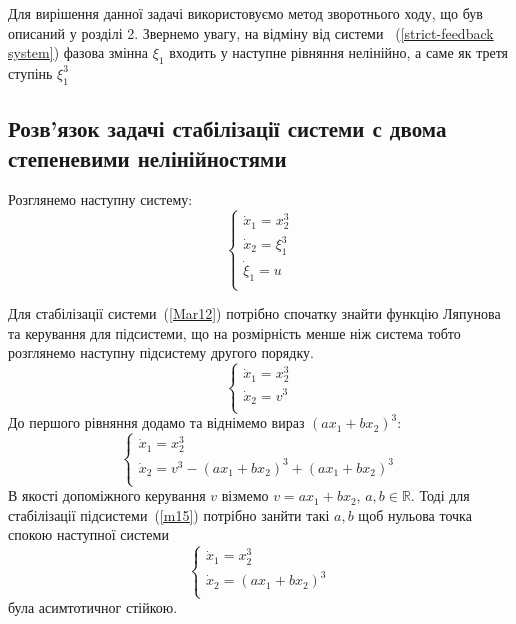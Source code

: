 \documentclass{article}
\begin{document}
Для вирішення данної задачі
використовуємо метод зворотнього ходу, що був описаний у розділі 2. Звернемо увагу, на відміну від 
системи ~(\ref{strict-feedback system}) фазова змінна $\xi_1$ входить у наступне рівняння нелінійно,
а саме як третя ступінь $\xi_1^3$
\pagebreak


\subsection{Розв'язок задачі стабілізації системи с двома степеневими нелінійностями}
Розглянемо наступну систему:
\begin{equation}\label{3dim nonlinear system}
    \begin{cases}
    \dot x_1 = x_2^3 \\
    \dot x_2 = \xi_1^3\\
    \dot \xi_1 = u\\
    \end{cases}
\end{equation}

Для стабілізації системи~(\ref{Mar12}) потрібно спочатку знайти функцію Ляпунова
та керування для підсистеми, що на розмірність менше ніж система  тобто розглянемо 
наступну підсистему другого порядку. 
\begin{equation} \label{2dim nonlinear system}
    \begin{cases}
    \dot x_1 = x_2^3\\
    \dot x_2 = v^3\\
    \end{cases}
\end{equation}
До першого рівняння додамо та віднімемо вираз $(ax_1+bx_2)^3$:
\begin{equation}\label{m15}
    \begin{cases}
    \dot x_1 = x_{2}^3 \\
    \dot x_2 = v^3 - (ax_1+bx_2)^3 +(ax_1+bx_2)^3 \\
    \end{cases}
\end{equation}
В якості допоміжного керування $v$ візмемо $v=ax_1+bx_2$, $a,b \in \mathbb{R}$. Тоді
для стабілізації підсистеми~(\ref{m15}) потрібно занйти такі  $a,b$ щоб нульова точка спокою 
наступної системи
\begin{equation}\label{2dim nonlinear system2}
    \begin{cases}
    \dot x_1 =x_{2}^3 \\
    \dot x_2 =(ax_1+bx_2)^3 \\
    \end{cases}
\end{equation}
була асимтотичног стійкою.
\end{document}
